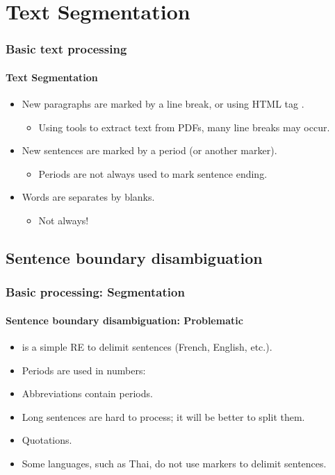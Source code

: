 \documentclass[xcolor=table]{beamer}
\begin{document}
\section{Text Segmentation}

\begin{frame}
\frametitle{Basic text processing}
\framesubtitle{Text Segmentation}

\begin{itemize}
	\item New paragraphs are marked by a line break, or using HTML tag .
	\begin{itemize}
		\item Using tools to extract text from PDFs, many line breaks may occur. 
	\end{itemize}
	\item New sentences are marked by a period (or another marker).
	\begin{itemize}
		\item Periods are not always used to mark sentence ending.
	\end{itemize}
	\item Words are separates by blanks.
	\begin{itemize}
		\item Not always!
	\end{itemize}
\end{itemize}

\end{frame}

\subsection{Sentence boundary disambiguation}

\begin{frame}
\frametitle{Basic processing: Segmentation}
\framesubtitle{Sentence boundary disambiguation: Problematic} 

\begin{itemize}
	\item \expword{/[.?!]/} is a simple RE to delimit sentences (French, English, etc.).
	\item Periods are used in numbers: 
	\item Abbreviations contain periods.
	\item Long sentences are hard to process; it will be better to split them.
	\item Quotations.
	\item Some languages, such as Thai, do not use markers to delimit sentences.
\end{itemize}

\end{frame}
\end{document}
